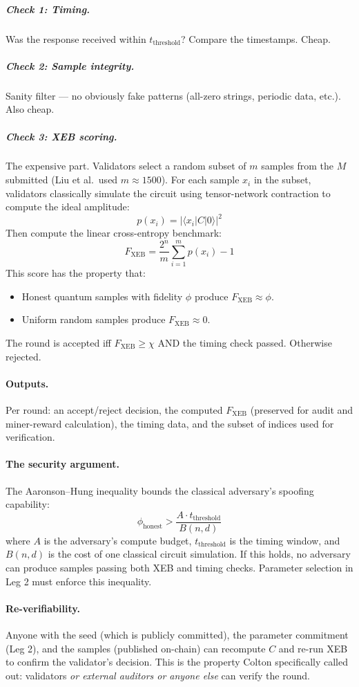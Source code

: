 \documentclass[11pt]{article}
\begin{document}
\subparagraph{Check 1: Timing.} Was the response received within $t_{\text{threshold}}$? Compare the timestamps. Cheap.

\subparagraph{Check 2: Sample integrity.} Sanity filter --- no obviously fake patterns (all-zero strings, periodic data, etc.). Also cheap.

\subparagraph{Check 3: XEB scoring.} The expensive part. Validators select a random subset of $m$ samples from the $M$ submitted (Liu et al.\ used $m \approx 1500$). For each sample $x_i$ in the subset, validators classically simulate the circuit using tensor-network contraction to compute the ideal amplitude:
\[
p(x_i) = |\langle x_i | C | 0 \rangle|^2
\]
Then compute the linear cross-entropy benchmark:
\[
F_{\text{XEB}} = \frac{2^n}{m} \sum_{i=1}^{m} p(x_i) - 1
\]
This score has the property that:
\begin{itemize}
    \item Honest quantum samples with fidelity $\phi$ produce $F_{\text{XEB}} \approx \phi$.
    \item Uniform random samples produce $F_{\text{XEB}} \approx 0$.
\end{itemize}
The round is accepted iff $F_{\text{XEB}} \geq \chi$ AND the timing check passed. Otherwise rejected.

\paragraph{Outputs.} Per round: an accept/reject decision, the computed $F_{\text{XEB}}$ (preserved for audit and miner-reward calculation), the timing data, and the subset of indices used for verification.

\paragraph{The security argument.} The Aaronson--Hung inequality bounds the classical adversary's spoofing capability:
\[
\phi_{\text{honest}} > \frac{A \cdot t_{\text{threshold}}}{B(n, d)}
\]
where $A$ is the adversary's compute budget, $t_{\text{threshold}}$ is the timing window, and $B(n, d)$ is the cost of one classical circuit simulation. If this holds, no adversary can produce samples passing both XEB and timing checks. Parameter selection in Leg 2 must enforce this inequality.

\paragraph{Re-verifiability.} Anyone with the seed (which is publicly committed), the parameter commitment (Leg 2), and the samples (published on-chain) can recompute $C$ and re-run XEB to confirm the validator's decision. This is the property Colton specifically called out: validators \emph{or external auditors or anyone else} can verify the round.
\end{document}
